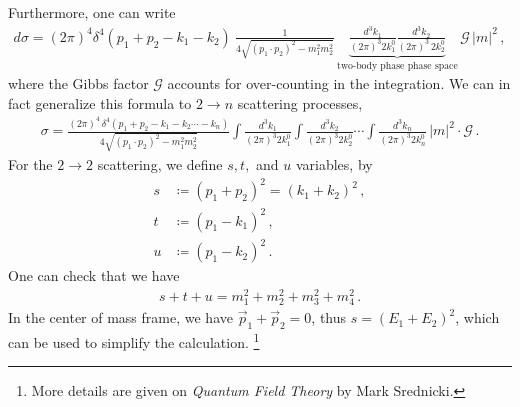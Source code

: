 \documentclass[11pt, onesided]{book}
\theoremstyle{break}
\theoremstyle{break}
\begin{document}
Furthermore, one can write
\begin{align*}
d\sigma = (2\pi)^4 \delta^4(p_1 +p_2 -k_1-k_2) \ \frac{1}{4\sqrt{(p_1\cdot p_2)^2 - m_1^2m_2^2}} \, \underbrace{\frac{d^3k_1}{(2\pi)^3 2k_1^0}\frac{d^3k_2}{(2\pi)^3 \, 2k_2^0}}_{\text{two-body phase phase space}} \, \mathcal{G}\, |m|^2\,,
\end{align*}
where the Gibbs factor $\mathcal{G}$ accounts for over-counting in the integration. We can in fact generalize this formula to $2\to n$ scattering processes, 
\begin{align*}
\sigma =  \frac{(2\pi)^4 \, \delta^4(p_1 +p_2 - k_1-k_2 \cdots-k_n)}{4\sqrt{(p_1\cdot p_2)^2 - m_1^2 m_2^2}} \int \frac{d^3k_1}{(2\pi)^3 2k_1^0}\int \frac{d^3k_2}{(2\pi)^3 2k_2^0}\cdots \int \frac{d^3k_n}{(2\pi)^3 2k_n^0} \,|m|^2 \cdot \mathcal{G}\,.
\end{align*}
For the $2\to 2$ scattering, we define $s,t,$ and $u$ variables, by
\begin{align*}
s &\coloneqq (p_1 + p_2)^2 = (k_1 + k_2)^2 \,,\\
t&\coloneqq (p_1-k_1)^2\,,\\
u &\coloneqq (p_1 - k_2)^2\,.
\end{align*}
One can check that we have
\begin{align*}
s+t + u = m_1^2 + m_2^2 + m_3^2 + m_4^2\,.
\end{align*}
In the center of mass frame, we have $\vec{p}_1 + \vec{p}_2 = 0$, thus $s = (E_1 + E_2)^2$, which can be used to simplify the calculation. \footnote{More details are given on \textit{Quantum Field Theory} by Mark Srednicki.}\\
\end{document}
